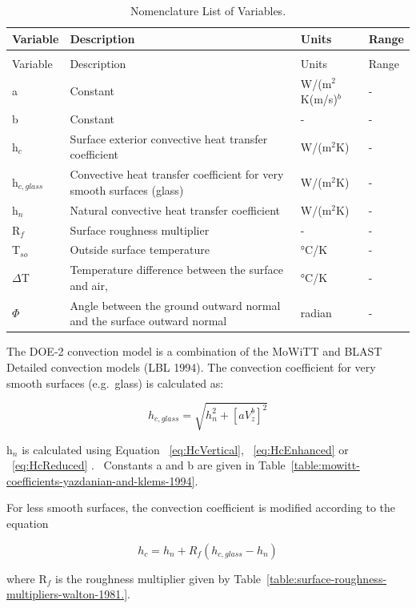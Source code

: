 \begin{longtable}[c]{p{0.5in}p{3.0in}p{1.5in}p{1.0in}}

\caption{Nomenclature List of Variables. \label{table:nomenclature-list-of-variables.-003}} \tabularnewline
\toprule
Variable & Description & Units & Range \tabularnewline
\midrule
\endfirsthead

\caption[]{Nomenclature List of Variables.} \tabularnewline
\toprule
Variable & Description & Units & Range \tabularnewline
\midrule
\endhead

a & Constant & W/(m\(^{2}\)K(m/s)\(^{b}\) & - \tabularnewline
b & Constant & - & - \tabularnewline
h\(_{c}\) & Surface exterior convective heat transfer coefficient & W/(m\(^{2}\)K) & - \tabularnewline
h\(_{c,glass}\) & Convective heat transfer coefficient for very smooth surfaces (glass) & W/(m\(^{2}\)K) & - \tabularnewline
h\(_{n}\) & Natural convective heat transfer coefficient & W/(m\(^{2}\)K) & - \tabularnewline
R\(_{f}\) & Surface roughness multiplier & - & - \tabularnewline
T\(_{so}\) & Outside surface temperature & °C/K & - \tabularnewline
$\Delta$T & Temperature difference between the surface and air, & °C/K & - \tabularnewline
$\Phi$ & Angle between the ground outward normal and the surface outward normal & radian & - \tabularnewline
\bottomrule
\end{longtable}


The DOE-2 convection model is a combination of the MoWiTT and BLAST Detailed convection models (LBL 1994). The convection coefficient for very smooth surfaces (e.g.~glass) is calculated as:

\begin{equation}
{h_{c,glass}} = \sqrt {h_n^2 + {{\left[ {aV_z^b} \right]}^2}}
\end{equation}

h\(_{n}\) is calculated using Equation ~\ref{eq:HcVertical}, ~\ref{eq:HcEnhanced} or ~\ref{eq:HcReduced} .~ Constants a and b are given in Table~\ref{table:mowitt-coefficients-yazdanian-and-klems-1994}.

For less smooth surfaces, the convection coefficient is modified according to the equation

\begin{equation}
{h_c} = {h_n} + {R_f}({h_{c,glass}} - {h_n})
\end{equation}

where R\(_{f}\) is the roughness multiplier given by Table~\ref{table:surface-roughness-multipliers-walton-1981.}.

